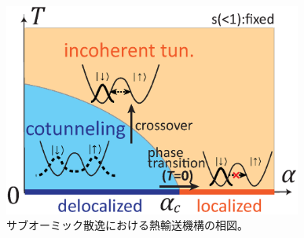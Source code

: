 \begin{figure}[tb]
	\centering
	\includegraphics[height=7.0cm]{sub_ohmic_phasediagram.eps}
	\caption{
	サブオーミック散逸における熱輸送機構の相図。
	}
	\label{fig:sub_ohmic_phasediagram}
\end{figure}
